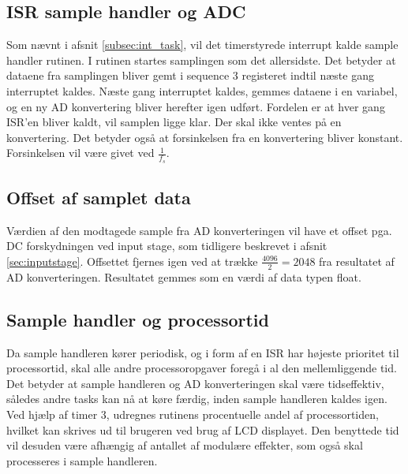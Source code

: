 \subsection{ISR sample handler og ADC}
Som nævnt i afsnit \ref{subsec:int_task}, vil det timerstyrede interrupt kalde sample handler rutinen.
I rutinen startes samplingen som det allersidste. 
Det betyder at dataene fra samplingen bliver gemt i sequence 3 registeret indtil næste gang interruptet kaldes. 
Næste gang interruptet kaldes, gemmes dataene i en variabel, og en ny AD konvertering bliver herefter igen udført. 
Fordelen er at hver gang ISR'en bliver kaldt, vil samplen ligge klar.
Der skal ikke ventes på en konvertering. 
Det betyder også at forsinkelsen fra en konvertering bliver konstant. Forsinkelsen vil være givet ved $\frac{1}{f_s}$. 

\subsection{Offset af samplet data}
Værdien af den modtagede sample fra AD konverteringen vil have et offset pga. DC forskydningen ved input stage, som tidligere beskrevet i afsnit \ref{sec:inputstage}.
Offsettet fjernes igen ved at trække $\frac{4096}{2} = 2048$ fra resultatet af AD konverteringen. 
Resultatet gemmes som en værdi af data typen float. 

\subsection{Sample handler og processortid}
Da sample handleren kører periodisk, og i form af en ISR har højeste prioritet til processortid, skal alle andre processoropgaver foregå i al den mellemliggende tid. 
Det betyder at sample handleren og AD konverteringen skal være tidseffektiv, således andre tasks kan nå at køre færdig, inden sample handleren kaldes igen. 
Ved hjælp af timer 3, udregnes rutinens procentuelle andel af processortiden, hvilket kan skrives ud til brugeren ved brug af LCD displayet. 
Den benyttede tid vil desuden være afhængig af antallet af modulære effekter, som også skal processeres i sample handleren. 

